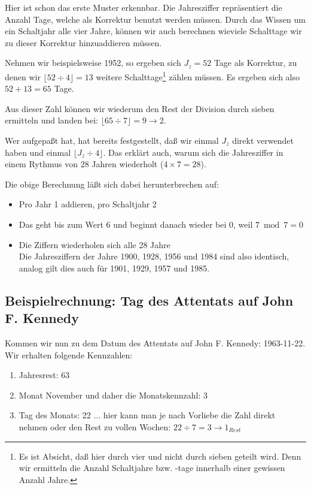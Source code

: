 \documentclass[version=last,paper=A4,fontsize=11pt,DIV=18]{scrartcl}
\begin{document}
Hier ist schon das erste Muster erkennbar. Die Jahresziffer repräsentiert die Anzahl Tage, welche als Korrektur benutzt werden müssen. Durch das Wissen um ein Schaltjahr alle vier Jahre, können wir auch berechnen wieviele Schalttage wir zu dieser Korrektur hinzuaddieren müssen.

Nehmen wir beispielsweise 1952, so ergeben sich $J_z = 52$ Tage als Korrektur, zu denen wir $\lfloor 52 \div 4 \rfloor = 13$ weitere Schalttage\footnote{Es ist Absicht, daß hier durch vier und nicht durch sieben geteilt wird. Denn wir ermitteln die Anzahl Schaltjahre bzw. -tage innerhalb einer gewissen Anzahl Jahre.} zählen müssen. Es ergeben sich also $52 + 13 = 65$ Tage.

Aus dieser Zahl können wir wiederum den Rest der Division durch sieben ermitteln und landen bei: $\lfloor 65 \div 7 \rfloor = 9 \rightarrow 2$.

Wer aufgepaßt hat, hat bereits festgestellt, daß wir einmal $J_z$ direkt verwendet haben und einmal $\lfloor J_z \div 4 \rfloor$. Das erklärt auch, warum sich die Jahresziffer in einem Rythmus von 28 Jahren wiederholt ($4 \times 7 = 28$).

Die obige Berechnung läßt sich dabei herunterbrechen auf:

\begin{itemize}
    \item Pro Jahr 1 addieren, pro Schaltjahr 2
    \item Das geht bis zum Wert 6 und beginnt danach wieder bei 0, weil $7 \bmod 7 = 0$
    \item Die Ziffern wiederholen sich alle 28 Jahre\\Die Jahresziffern der Jahre 1900, 1928, 1956 und 1984 sind also identisch, analog gilt dies auch für 1901, 1929, 1957 und 1985.
\end{itemize}

\subsection*{Beispielrechnung: Tag des Attentats auf John F. Kennedy}

Kommen wir nun zu dem Datum des Attentats auf John F. Kennedy: 1963-11-22. Wir erhalten folgende Kennzahlen:

\begin{enumerate}
    \item Jahresrest: 63
    \item Monat November und daher die Monatskennzahl: 3
    \item Tag des Monats: 22 ... hier kann man je nach Vorliebe die Zahl direkt nehmen oder den Rest zu vollen Wochen: $22 \div 7 = 3 \rightarrow 1_{Rest}$
\end{enumerate}
\end{document}
